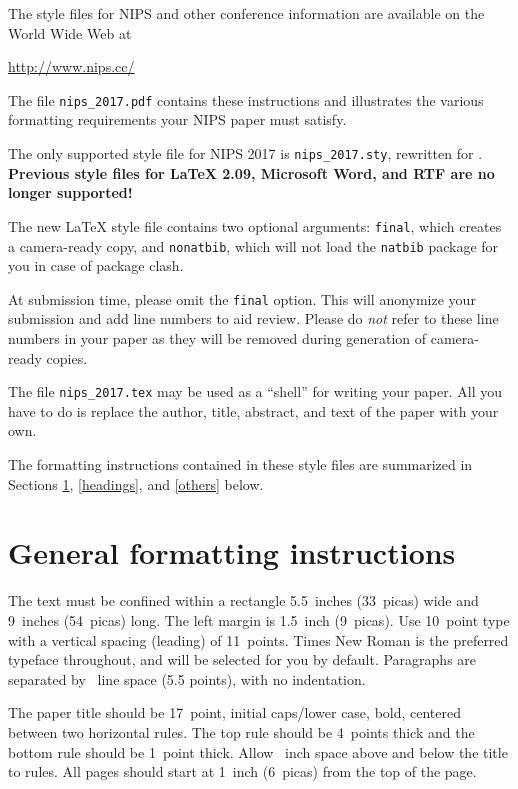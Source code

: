 \documentclass{article}
\begin{document}
	The style files for NIPS and other conference information are
	available on the World Wide Web at
	\begin{center}
		\url{http://www.nips.cc/}
	\end{center}
	The file \verb+nips_2017.pdf+ contains these instructions and
	illustrates the various formatting requirements your NIPS paper must
	satisfy.
	
	The only supported style file for NIPS 2017 is \verb+nips_2017.sty+,
	rewritten for \LaTeXe{}.  \textbf{Previous style files for \LaTeX{}
		2.09, Microsoft Word, and RTF are no longer supported!}
	
	The new \LaTeX{} style file contains two optional arguments:
	\verb+final+, which creates a camera-ready copy, and \verb+nonatbib+,
	which will not load the \verb+natbib+ package for you in case of
	package clash.
	
	At submission time, please omit the \verb+final+ option. This will
	anonymize your submission and add line numbers to aid review.  Please
	do \emph{not} refer to these line numbers in your paper as they will
	be removed during generation of camera-ready copies.
	
	The file \verb+nips_2017.tex+ may be used as a ``shell'' for writing
	your paper. All you have to do is replace the author, title, abstract,
	and text of the paper with your own.
	
	The formatting instructions contained in these style files are
	summarized in Sections \ref{gen_inst}, \ref{headings}, and
	\ref{others} below.
	
	\section{General formatting instructions}
	\label{gen_inst}
	
	The text must be confined within a rectangle 5.5~inches (33~picas)
	wide and 9~inches (54~picas) long. The left margin is 1.5~inch
	(9~picas).  Use 10~point type with a vertical spacing (leading) of
	11~points.  Times New Roman is the preferred typeface throughout, and
	will be selected for you by default.  Paragraphs are separated by
	~line space (5.5 points), with no indentation.
	
	The paper title should be 17~point, initial caps/lower case, bold,
	centered between two horizontal rules. The top rule should be 4~points
	thick and the bottom rule should be 1~point thick. Allow
	~inch space above and below the title to rules. All
	pages should start at 1~inch (6~picas) from the top of the page.
	
\end{document}
